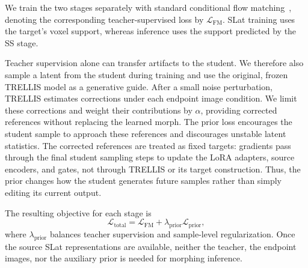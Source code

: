 We train the two stages separately with standard conditional flow
matching~\cite{lipman2022flowmatching}, denoting the corresponding
teacher-supervised loss by $\mathcal L_{\mathrm{FM}}$.
SLat training uses the target's voxel support, whereas inference uses the
support predicted by the SS stage.

Teacher supervision alone can transfer artifacts to the student.
We therefore also sample a latent from the student during training and
use the original, frozen TRELLIS model as a generative guide.
After a small noise perturbation, TRELLIS estimates corrections under
each endpoint image condition.
We limit these corrections and weight their contributions by $\alpha$,
providing corrected references without replacing the learned morph.
The prior loss encourages the student sample to approach these references
and discourages unstable latent statistics.
The corrected references are treated as fixed targets: gradients pass
through the final student sampling steps to update the LoRA adapters,
source encoders, and gates, not through TRELLIS or its target construction.
Thus, the prior changes how the student generates future samples rather
than simply editing its current output.

The resulting objective for each stage is
\begin{equation}
\mathcal L_{\mathrm{total}}
=\mathcal L_{\mathrm{FM}}
+\lambda_{\mathrm{prior}}\mathcal L_{\mathrm{prior}},
\label{eq:method_objective}
\end{equation}
where $\lambda_{\mathrm{prior}}$ balances teacher supervision and sample-level
regularization. 
Once the source SLat representations are available, neither the teacher,
the endpoint images, nor the auxiliary prior is needed for morphing inference.